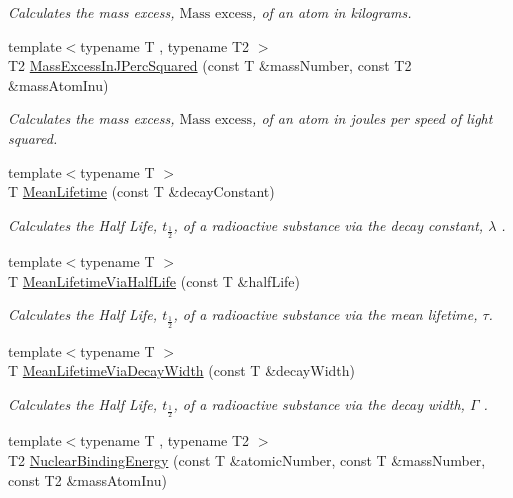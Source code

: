 \begin{DoxyCompactItemize}
\begin{DoxyCompactList}\small\item\em Calculates the mass excess, $\text{Mass excess}$, of an atom in kilograms. \end{DoxyCompactList}\item 
{\footnotesize template$<$typename T , typename T2 $>$ }\\T2 \mbox{\hyperlink{group___e_g_x_phys-_mass_excess_ga3eb487f438543e950b9c5aece4c5b409}{Mass\+Excess\+In\+J\+Perc\+Squared}} (const T \&mass\+Number, const T2 \&mass\+Atom\+Inu)
\begin{DoxyCompactList}\small\item\em Calculates the mass excess, $\text{Mass excess}$, of an atom in joules per speed of light squared. \end{DoxyCompactList}\item 
{\footnotesize template$<$typename T $>$ }\\T \mbox{\hyperlink{group___e_g_x_phys-_mean_lifetime_gaa9e3c2deedda4bc7a745568b06fc47eb}{Mean\+Lifetime}} (const T \&decay\+Constant)
\begin{DoxyCompactList}\small\item\em Calculates the Half Life, $t_{\frac{1}{2}}$, of a radioactive substance via the decay constant, $\lambda$ . \end{DoxyCompactList}\item 
{\footnotesize template$<$typename T $>$ }\\T \mbox{\hyperlink{group___e_g_x_phys-_mean_lifetime_ga2586e148263e1f6c8ff89f269a0930ea}{Mean\+Lifetime\+Via\+Half\+Life}} (const T \&half\+Life)
\begin{DoxyCompactList}\small\item\em Calculates the Half Life, $t_{\frac{1}{2}}$, of a radioactive substance via the mean lifetime, $\tau$. \end{DoxyCompactList}\item 
{\footnotesize template$<$typename T $>$ }\\T \mbox{\hyperlink{group___e_g_x_phys-_mean_lifetime_ga8a1dda4168b4b25db93bf1ae7832fd7e}{Mean\+Lifetime\+Via\+Decay\+Width}} (const T \&decay\+Width)
\begin{DoxyCompactList}\small\item\em Calculates the Half Life, $t_{\frac{1}{2}}$, of a radioactive substance via the decay width, $\Gamma$ . \end{DoxyCompactList}\item 
{\footnotesize template$<$typename T , typename T2 $>$ }\\T2 \mbox{\hyperlink{group___e_g_x_phys-_nuclear_binding_energy_gab6832bf15ead7b4e867e759e0a2a078e}{Nuclear\+Binding\+Energy}} (const T \&atomic\+Number, const T \&mass\+Number, const T2 \&mass\+Atom\+Inu)

\end{DoxyCompactItemize}
